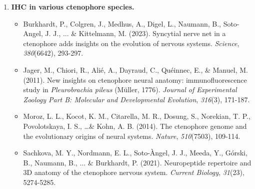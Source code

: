 \documentclass[10pt]{report}
\begin{document}
\begin{enumerate}
	\item \textbf{IHC in various ctenophore species.}
		\begin{itemize}
			\item Burkhardt, P., Colgren, J., Medhus, A., Digel, L., Naumann, B., Soto-Angel, J. J., ... \& Kittelmann, M. (2023). Syncytial nerve net in a ctenophore adds insights on the evolution of nervous systems. \textit{Science}, \textit{380}(6642), 293-297. 
			\item Jager, M., Chiori, R., Alié, A., Dayraud, C., Quéinnec, E., \& Manuel, M. (2011). New insights on ctenophore neural anatomy: immunofluorescence study in \textit{Pleurobrachia pileus} (Müller, 1776). \textit{Journal of Experimental Zoology Part B: Molecular and Developmental Evolution}, \textit{316}(3), 171-187. 
			\item Moroz, L. L., Kocot, K. M., Citarella, M. R., Dosung, S., Norekian, T. P., Povolotskaya, I. S., \ldots \& Kohn, A. B. (2014). The ctenophore genome and the evolutionary origins of neural systems. \textit{Nature}, \textit{510}(7503), 109-114. 
			\item Sachkova, M. Y., Nordmann, E. L., Soto-Àngel, J. J., Meeda, Y., Górski, B., Naumann, B., ... \& Burkhardt, P. (2021). Neuropeptide repertoire and 3D anatomy of the ctenophore nervous system. \textit{Current Biology}, \textit{31}(23), 5274-5285. 
		\end{itemize}
\end{enumerate}
\end{document}
